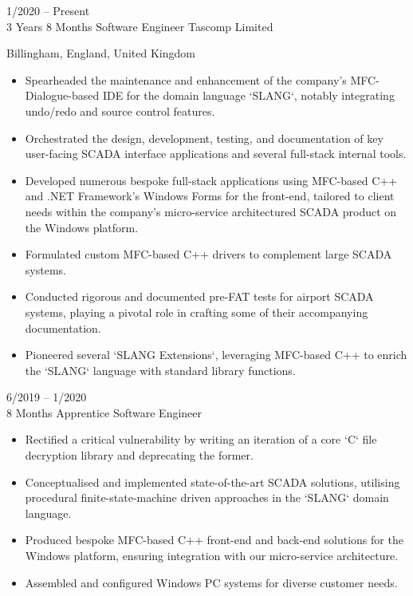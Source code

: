 \documentclass[9pt]{developercv} %
\begin{document}
\begin{entrylist}
	\entry
		{1/2020 -- Present\\3 Years 8 Months}
		{Software Engineer}
		{Tascomp Limited}
		{Billingham, England, United Kingdom
		
		\begin{itemize}
			\item[\ding{117}] Spearheaded the maintenance and enhancement of the company's MFC-Dialogue-based IDE for the domain language `SLANG`, notably integrating undo/redo and source control features.
			\item[\ding{117}] Orchestrated the design, development, testing, and documentation of key user-facing SCADA interface applications and several full-stack internal tools.
			\item[\ding{117}] Developed numerous bespoke full-stack applications using MFC-based C++ and .NET Framework's Windows Forms for the front-end, tailored to client needs within the company's micro-service architectured SCADA product on the Windows platform.
			\item[\ding{117}] Formulated custom MFC-based C++ drivers to complement large SCADA systems.
			\item[\ding{117}] Conducted rigorous and documented pre-FAT tests for airport SCADA systems, playing a pivotal role in crafting some of their accompanying documentation.
			\item[\ding{117}] Pioneered several `SLANG Extensions`, leveraging MFC-based C++ to enrich the `SLANG` language with standard library functions.
		\end{itemize}
		}
	\entry
		{6/2019 -- 1/2020\\8 Months}
		{Apprentice Software Engineer}
		{}
		{
		\begin{itemize}
			\item[\ding{117}] Rectified a critical vulnerability by writing an iteration of a core `C` file decryption library and deprecating the former.
			\item[\ding{117}] Conceptualised and implemented state-of-the-art SCADA solutions, utilising procedural finite-state-machine driven approaches in the `SLANG` domain language.
			\item[\ding{117}] Produced bespoke MFC-based C++ front-end and back-end solutions for the Windows platform, ensuring integration with our micro-service architecture.
			\item[\ding{117}] Assembled and configured Windows PC systems for diverse customer needs.
		\end{itemize}
		
}
\end{entrylist}
\end{document}
